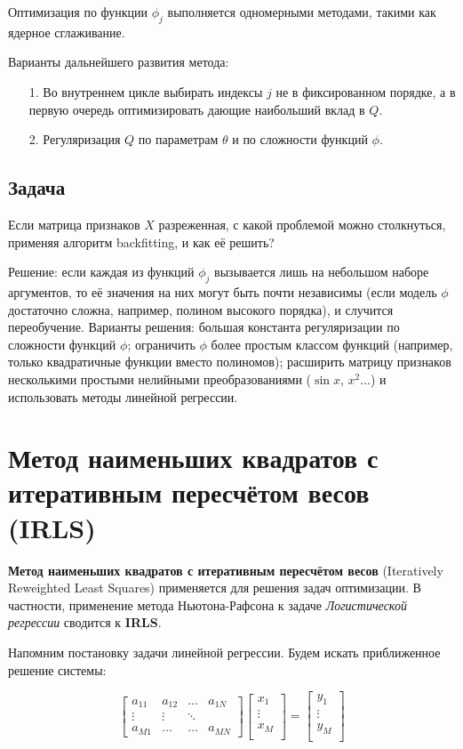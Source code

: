 Оптимизация по функции $\phi_j$ выполняется одномерными методами, такими как ядерное сглаживание.

Варианты дальнейшего развития метода:
\begin{itemize}
    \item [1.] Во внутреннем цикле выбирать индексы $j$ не в фиксированном порядке, а в первую очередь оптимизировать дающие наибольший вклад в $Q$.
    \item [2.] Регуляризация $Q$ по параметрам $\theta$ и по сложности функций $\phi$.
\end{itemize}

\subsection{Задача}

Если матрица признаков $X$ разреженная, с какой проблемой можно столкнуться, применяя алгоритм backfitting, и как её решить?

Решение: если каждая из функций $\phi_j$ вызывается лишь на небольшом наборе аргументов, то её значения на них могут быть почти независимы (если модель $\phi$ достаточно сложна, например, полином высокого порядка), и случится переобучение. Варианты решения: большая константа регуляризации по сложности функций $\phi$; ограничить $\phi$ более простым классом функций (например, только квадратичные функции вместо полиномов); расширить матрицу признаков несколькими простыми нелийными преобразованиями ($\sin x$, $x^2$...) и использовать методы линейной регрессии.

\section{Метод наименьших квадратов с итеративным пересчётом весов (IRLS)}

\textbf{Метод наименьших квадратов с итеративным пересчётом весов} (Iteratively Reweighted Least Squares) применяется для решения задач оптимизации. В частности, применение метода Ньютона-Рафсона к задаче \textit{Логистической регрессии} сводится к \textbf{IRLS}.

Напомним постановку задачи линейной регрессии. Будем искать приближенное решение системы:

\[ \begin{bmatrix} 
    a_{11} & a_{12} & \dots  & a_{1N} \\
    \vdots & \vdots & \ddots & \\
    a_{M1} & \dots  & \dots  & a_{MN}
\end{bmatrix} \begin{bmatrix} 
    x_{1} \\
    \vdots \\
    x_{M} \\ 
\end{bmatrix}
=
\begin{bmatrix} 
    y_{1} \\
    \vdots \\
    y_{M} \\
\end{bmatrix} \]

